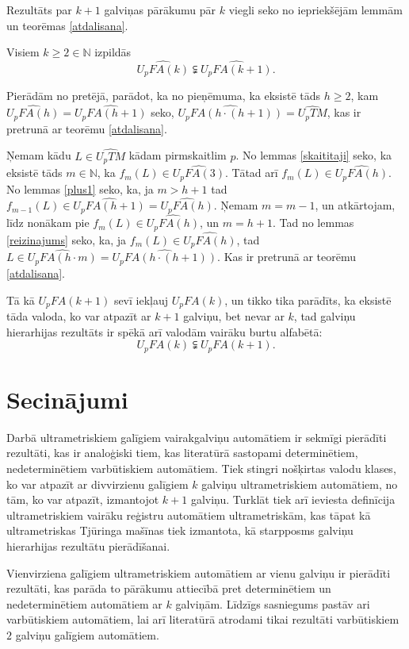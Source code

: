 \documentclass{ludis}
\begin{document}
Rezultāts par $k + 1$ galviņas pārākumu pār $k$ viegli seko no iepriekšējām lemmām un teorēmas \ref{atdalisana}.
\begin{teorema}
Visiem $k \geq 2 \in \mathbb{N}$ izpildās
\[
	\widehat{U_pFA(k)} \subsetneqq \widehat{U_pFA(k + 1)}.
\]
\end{teorema}
\begin{pieradijums}
Pierādām no pretējā, parādot, ka no pieņēmuma, ka eksistē tāds $h \geq 2$, kam $\widehat{U_pFA(h)} = \widehat{U_pFA(h + 1)}$ seko, $\widehat{U_pFA(h \cdot (h + 1))} = \widehat{U_pTM}$, kas ir pretrunā ar teorēmu \ref{atdalisana}.

Ņemam kādu $L \in \widehat{U_pTM}$ kādam pirmskaitlim $p$. No lemmas \ref{skaititaji} seko, ka eksistē tāds $m \in \mathbb{N}$, ka $f_m(L) \in \widehat{U_pFA(3)}$. Tātad arī $f_m(L) \in \widehat{U_pFA(h)}$. No lemmas \ref{plus1} seko, ka, ja $m > h + 1$ tad $f_{m-1}(L) \in \widehat{U_pFA(h + 1)} = \widehat{U_pFA(h)}$. Ņemam $m = m - 1$, un atkārtojam, līdz nonākam pie $f_m(L) \in \widehat{U_pFA(h)}$, un $m = h + 1$. Tad no lemmas \ref{reizinajums} seko, ka, ja $f_m(L) \in \widehat{U_pFA(h)}$, tad $L \in \widehat{U_pFA(h \cdot m)} = \widehat{U_pFA(h \cdot (h + 1))}$. Kas ir pretrunā ar teorēmu \ref{atdalisana}.
\end{pieradijums}
\begin{sekas}
Tā kā $U_pFA(k + 1)$ sevī iekļauj $U_pFA(k)$, un tikko tika parādīts, ka eksistē tāda valoda, ko var atpazīt ar $k+1$ galviņu, bet nevar ar $k$, tad galviņu hierarhijas rezultāts ir spēkā arī valodām vairāku burtu alfabētā:
\[
	U_pFA(k) \subsetneqq U_pFA(k + 1).
\]
\end{sekas}

\chapter{Secinājumi}
Darbā ultrametriskiem galīgiem vairakgalviņu automātiem ir sekmīgi pierādīti rezultāti, kas ir analoģiski tiem, kas literatūrā sastopami determinētiem, nedeterminētiem varbūtiskiem automātiem. Tiek stingri nošķirtas valodu klases, ko var atpazīt ar divvirzienu galīgiem $k$ galviņu ultrametriskiem automātiem, no tām, ko var atpazīt, izmantojot $k+1$ galviņu. Turklāt tiek arī ieviesta definīcija ultrametriskiem vairāku reģistru automātiem ultrametriskām, kas tāpat kā ultrametriskas Tjūringa mašīnas tiek izmantota, kā starpposms galviņu hierarhijas rezultātu pierādīšanai.

Vienvirziena galīgiem ultrametriskiem automātiem ar vienu galviņu ir pierādīti rezultāti, kas parāda to pārākumu attiecībā pret determinētiem un nedeterminētiem automātiem ar $k$ galviņām. Līdzīgs sasniegums pastāv ari varbūtiskiem automātiem, lai arī literatūrā atrodami tikai rezultāti varbūtiskiem $2$ galviņu galīgiem automātiem.
\end{document}
